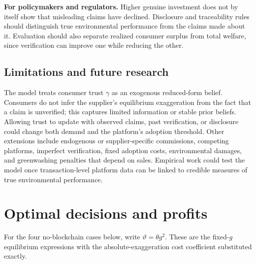 \documentclass[preprint,review,12pt,authoryear,nopreprintline]{elsarticle}
\theoremstyle{definition}
\begin{document}
\textbf{For policymakers and regulators.} Higher genuine investment does not by itself show that misleading claims have declined. Disclosure and traceability rules should distinguish true environmental performance from the claims made about it. Evaluation should also separate realized consumer surplus from total welfare, since verification can improve one while reducing the other.

\subsection{Limitations and future research}

The model treats consumer trust $\gamma$ as an exogenous reduced-form belief. Consumers do not infer the supplier's equilibrium exaggeration from the fact that a claim is unverified; this captures limited information or stable prior beliefs. Allowing trust to update with observed claims, past verification, or disclosure could change both demand and the platform's adoption threshold. Other extensions include endogenous or supplier-specific commissions, competing platforms, imperfect verification, fixed adoption costs, environmental damages, and greenwashing penalties that depend on sales. Empirical work could test the model once transaction-level platform data can be linked to credible measures of true environmental performance.

\appendix
\section{Optimal decisions and profits}\label{app:A}
\begingroup\small

For the four no-blockchain cases below, write $\vartheta=\theta g^2$. These are the fixed-$g$ equilibrium expressions with the absolute-exaggeration cost coefficient substituted exactly.
\end{document}

